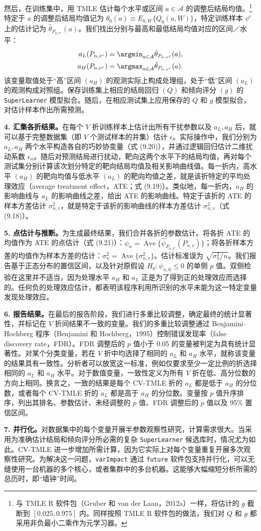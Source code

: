 然后，在训练集中，用 TMLE 估计每个水平或区间 $a\in\mathcal A$ 的调整后结局均值。\footnote{与 TMLE R 软件包（Gruber 和 van der Laan，2012a）一样，将估计的 $g$ 截断到 $[0.025,0.975]$ 内。同样按照 TMLE R 软件包的做法，我们对 $Q$ 和 $g$ 都采用非负最小二乘作为元学习器。}特定于 $a$ 的调整后结局均值记为 $\theta_0(a)\equiv E_{0,W}\{Q_0(a,W)\}$，特定训练样本 $v^c$ 上的估计记为 $\hat\theta_{P_{n,v^c}}(a)$。我们找出分别与最高和最低结局均值对应的区间／水平：
\[
\begin{aligned}
a_L(P_{n,v^c})&=\argmin_{a\in\mathcal A}\hat\theta_{P_{n,v^c}}(a),\\
a_H(P_{n,v^c})&=\argmax_{a\in\mathcal A}\hat\theta_{P_{n,v^c}}(a).
\end{aligned}
\]
该变量取值处于“高”区间 $(a_H)$ 的观测实际上构成处理组，处于“低”区间 $(a_L)$ 的观测构成对照组。保存训练集上相应的结局回归 $(Q)$ 和倾向评分 $(g)$ 的 \texttt{SuperLearner} 模型拟合。随后，在相应测试集上应用保存的 $Q$ 和 $g$ 模型拟合，对估计样本作出所需预测。

\noindent\textbf{4. 汇集各折结果。}在每个 $V$ 折训练样本上估计出所有干扰参数以及 $a_L,a_H$ 后，就可以基于完整数据集（即 $V$ 个测试样本的并集）估计 $\epsilon$。实际操作中，我们分别为 $a_L,a_H$ 两个水平构造各自的巧妙协变量（式 (9.20)），并通过逻辑回归估计二维扰动系数 $\epsilon_n$。随后对预测结局进行扰动，靶向这两个水平下的结局均值，再对每个测试集分别计算该次划分特定的靶向结局均值及相关影响曲线值。每一折内，高水平 $(a_H)$ 的靶向均值与低水平 $(a_L)$ 的靶向均值之差，就是该折特定的平均处理效应（average treatment effect，ATE；式 (9.19)）。类似地，每一折内，$a_H$ 的影响曲线与 $a_L$ 的影响曲线之差，给出 ATE 的影响曲线。特定于该折的 ATE 的样本方差估计 $\sigma_{n,v}^2$，就是特定于该折的影响曲线的样本方差估计 $\sigma_{n,v}^2$（式 (9.18)）。

\noindent\textbf{5. 点估计与推断。}为生成最终结果，我们合并各折的参数估计。将各折 ATE 的均值作为 ATE 的点估计（式 (9.21)）：$\psi_n=\operatorname{Ave}\{\hat\psi_{P_{n,v^c}}(P_{n,v})\}$；将各折样本方差的均值作为样本方差的估计：$\sigma_n^2=\operatorname{Ave}\{\sigma_{n,v}^2\}$。估计标准误为 $\sqrt{\sigma_n^2/n}$。我们报告基于正态分布的置信区间，以及针对原假设 $H_0:\psi_{n,0}\leq0$ 的单侧 $p$ 值。双侧检验在这里并不适当，因为处理水平 $a_H$ 和 $a_L$ 正是为了得到正的处理效应而选择的。任何负的处理效应估计，都表明该程序利用所识别的水平未能为这一特定变量发现处理效应。

\noindent\textbf{6. 报告结果。}在最后的报告阶段，我们进行多重比较调整，确定最终的统计显著性，并标记在 $V$ 折间结果不一致的变量。我们的多重比较调整通过 Benjamini–Hochberg 程序（Benjamini 和 Hochberg，1995）控制错误发现率（false discovery rate，FDR）。FDR 调整后的 $p$ 值小于 0.05 的变量被判定为具有统计显著性。对某个分类变量，若在 $V$ 折中均选择了相同的 $a_L$ 和 $a_H$ 水平，就称该变量的结果具有一致性。分析者可以放宽这一标准，例如仅要求至少一定比例的折选择相同的 $a_L$ 和 $a_H$ 水平。对于数值变量，一致性定义为所有 $V$ 折在低、高分位数的方向上相同。换言之，一致的结果是每个 CV-TMLE 折的 $a_L$ 都是低于 $a_H$ 的分位数，或者每个 CV-TMLE 折的 $a_L$ 都是高于 $a_H$ 的分位数。变量按 $p$ 值升序排序，列出其排名、参数估计、未经调整的 $p$ 值、FDR 调整后的 $p$ 值以及 95\% 置信区间。

\noindent\textbf{7. 并行化。}对数据集中的每个变量开展半参数观察性研究，计算需求很大。当采用为准确估计结局和倾向评分所必需的复杂 \texttt{SuperLearner} 候选库时，情况尤为如此。CV-TMLE 进一步增加所需计算，因为它实际上对每个变量重复开展多次观察性研究。为解决这一问题，\texttt{varImpact} 通过 \texttt{future} 软件包支持并行化，可以无缝使用一台机器的多个核心，或者集群中的多台机器。这能够大幅缩短分析所需的总历时，即“墙钟”时间。
